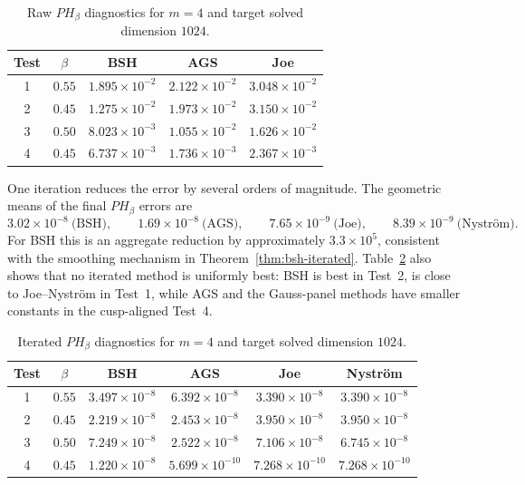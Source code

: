 \documentclass[11pt,a4paper]{amsart}
\theoremstyle{plain}
\theoremstyle{definition}
\theoremstyle{remark}
\begin{document}
\begin{table}[t]
\centering
\caption{Raw $PH_\beta$ diagnostics for $m=4$ and target solved dimension $1024$.}
\label{tab:raw-comparison-m4}
\small
\begin{tabular}{ccccc}
\toprule
Test & $\beta$ & BSH & AGS & Joe\\
\midrule
1 & $0.55$ & $1.895{\times}10^{-2}$ & $2.122{\times}10^{-2}$
  & $3.048{\times}10^{-2}$\\
2 & $0.45$ & $1.275{\times}10^{-2}$ & $1.973{\times}10^{-2}$
  & $3.150{\times}10^{-2}$\\
3 & $0.50$ & $8.023{\times}10^{-3}$ & $1.055{\times}10^{-2}$
  & $1.626{\times}10^{-2}$\\
4 & $0.45$ & $6.737{\times}10^{-3}$ & $1.736{\times}10^{-3}$
  & $2.367{\times}10^{-3}$\\
\bottomrule
\end{tabular}
\end{table}

One iteration reduces the error by several orders of magnitude.  The
geometric means of the final $PH_\beta$ errors are
\[
 3.02\times10^{-8}\ \text{(BSH)},\qquad
 1.69\times10^{-8}\ \text{(AGS)},\qquad
 7.65\times10^{-9}\ \text{(Joe)},\qquad
 8.39\times10^{-9}\ \text{(Nystr\"om)}.
\]
For BSH this is an aggregate reduction by approximately
$3.3\times10^5$, consistent with the smoothing mechanism in
Theorem~\ref{thm:bsh-iterated}.  Table~\ref{tab:iterated-comparison-m4}
also shows that no iterated method is uniformly best: BSH is best in
Test~2, is close to Joe--Nystr\"om in Test~1, while AGS and the
Gauss-panel methods have smaller constants in the cusp-aligned Test~4.

\begin{table}[t]
\centering
\caption{Iterated $PH_\beta$ diagnostics for $m=4$ and target solved dimension $1024$.}
\label{tab:iterated-comparison-m4}
\small
\begin{tabular}{cccccc}
\toprule
Test & $\beta$ & BSH & AGS & Joe & Nystr\"om\\
\midrule
1 & $0.55$ & $3.497{\times}10^{-8}$ & $6.392{\times}10^{-8}$
  & $3.390{\times}10^{-8}$ & $3.390{\times}10^{-8}$\\
2 & $0.45$ & $2.219{\times}10^{-8}$ & $2.453{\times}10^{-8}$
  & $3.950{\times}10^{-8}$ & $3.950{\times}10^{-8}$\\
3 & $0.50$ & $7.249{\times}10^{-8}$ & $2.522{\times}10^{-8}$
  & $7.106{\times}10^{-8}$ & $6.745{\times}10^{-8}$\\
4 & $0.45$ & $1.220{\times}10^{-8}$ & $5.699{\times}10^{-10}$
  & $7.268{\times}10^{-10}$ & $7.268{\times}10^{-10}$\\
\bottomrule
\end{tabular}
\end{table}
\end{document}
